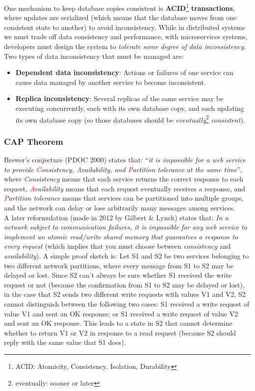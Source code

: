 One mechanism to keep database copies consistent is \textbf{ACID}\footnote{ACID: Atomicity, Consistency, Isolation, Durability} \textbf{transactions}, where updates are serialized (which means that the database moves from one consistent state to another) to avoid inconsistency. While in distributed systems we must trade off data consistency and performance, with microservices systems, developers must design the system to \textit{tolerate some degree of data inconsistency}. Two types of data inconsistency that must be managed are:
\begin{itemize}
    \item \textbf{Dependent data inconsistency}: Actions or failures of one service can cause data managed by another service to become inconsistent.
    \item \textbf{Replica inconsistency}: Several replicas of the same service may be executing concurrently, each with its own database copy, and each updating its own database copy (so those databases should be \textit{eventually}\footnote{eventually: sooner or later} \textit{consistent}).
\end{itemize}

\subsubsection{CAP Theorem}

Brewer’s conjecture (PDOC 2000) states that: ``\textit{it is impossible for a web service to provide \textcolor{red}{C}onsistency, \textcolor{red}{A}vailability, and \textcolor{red}{P}artition tolerance at the same time}'', where \textit{\textcolor{red}{C}onsistency} means that each service returns the correct response to each request, \textit{\textcolor{red}{A}vailability} means that each request eventually receives a response, and \newline \textit{\textcolor{red}{P}artition tolerance} means that services can be partitioned into multiple groups, and the network can delay or lose arbitrarily many messages among services. \\

A later reformulation (made in 2012 by Gilbert \& Lynch) states that: \textit{In a network subject to communication failures, it is impossible for any web service to implement an atomic read/write shared memory that guarantees a response to every request} (which implies that you must choose between \textit{consistency} and \textit{availability}). \newline
A simple proof sketch is: Let S1 and S2 be two services belonging to two different network partitions, where every message from S1 to S2 may be delayed or lost. Since S2 can't always be sure whether S1 received the write request or not (because the confirmation from S1 to S2 may be delayed or lost), in the case that S2 sends two different write requests with values V1 and V2, S2 cannot distinguish between the following two cases: S1 received a write request of value V1 and sent an OK response; or S1 received a write request of value V2 and sent an OK response. This leads to a state in S2 that cannot determine whether to return V1 or V2 in response to a read request (because S2 should reply with the same value that S1 does).

